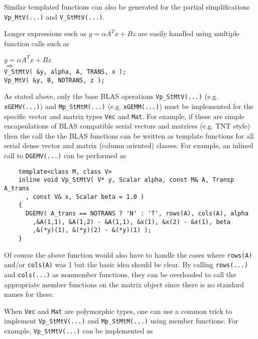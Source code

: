 \documentclass[acmtoms,acmnow]{acmtrans2m}
\begin{document}
Similar templated functions can also be generated for the partial
simplifications {}\texttt{Vp\_MtV(...)} and {}\texttt{V\_StMtV(...)}.

Longer expressions such as $y = \alpha A^T x + B z$ are easily handled using multiple
function calls such as\\[1ex]

{\bsinglespace
\hspace*{4ex}\parbox{\textwidth}{
$y = \alpha A^T x + B z$ \\
$\Longrightarrow$\\
\texttt{V\_StMtV( \&y, alpha, A, TRANS, x );}\\
\texttt{Vp\_MtV( \&y, B, NOTRANS, z );}
}
\esinglespace}

As stated above, only the base BLAS operations {}\texttt{Vp\_StMtV(...)} (e.g.
{}\texttt{xGEMV(...)})  and {}\texttt{Mp\_StMtM(...)} 
(e.g. {}\texttt{xGEMM(...)}) must be implemented for the specific vector and
matrix types {}\texttt{Vec} and {}\texttt{Mat}.  For example, if these are
simple encapsulations of BLAS compatible serial vectors and matrices (e.g. TNT
style) then the call the the BLAS functions can be written as template
functions for all serial dense vector and matrix (column oriented) classes.
For example, an inlined call to {}\texttt{DGEMV(...)} can be performed as\\[1ex]

{\bsinglespace\small
\begin{minipage}{\textwidth}
\begin{verbatim}
    template<class M, class V>
    inline void Vp_StMtV( V* y, Scalar alpha, const M& A, Transp A_trans
      , const V& x, Scalar beta = 1.0 )
    {
      DGEMV( A_trans == NOTRANS ? 'N' : 'T', rows(A), cols(A), alpha
        ,&A(1,1), &A(1,2) - &A(1,1), &x(1), &x(2) - &x(1), beta
        ,&(*y)(1), &(*y)(2) - &(*y)(1) );
    }
\end{verbatim}
\end{minipage}
\esinglespace}

Of course the above function would also have to handle the cases where
{}\texttt{rows(A)} and/or {}\texttt{cols(A)} was 1 but the basic idea should
be clear.  By calling {}\texttt{rows(...)} and {}\texttt{cols(...)} as
nonmember functions, they can be overloaded to call the appropriate member
functions on the matrix object since there is no standard names for these.

When {}\texttt{Vec} and {}\texttt{Mat} are polymorphic types, one can use a
common trick to implement {}\texttt{Vp\_StMtV(...)} and
{}\texttt{Mp\_StMtM(...)} using member functions.  For example,
{}\texttt{Vp\_StMtV(...)} can be implemented as\\[1ex]
\end{document}
